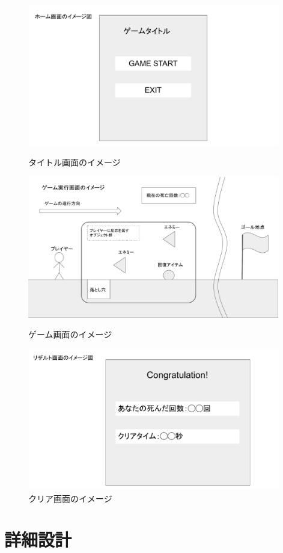 \documentclass[11pt,a4paper]{jsarticle}
\begin{document}
\begin{figure}[htbp]
	\centering
	\includegraphics[width=110mm]{1.pdf}
	\caption{タイトル画面のイメージ}
	\includegraphics[width=110mm]{2.pdf}
	\caption{ゲーム画面のイメージ}
	\includegraphics[width=110mm]{3.pdf}
	\caption{クリア画面のイメージ}
\end{figure}
\clearpage
\section{詳細設計}
\end{document}
